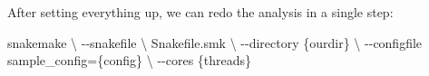 \documentclass[
  letterpaper,
  DIV=11,
  numbers=noendperiod]{scrreprt}
\newenvironment{Shaded}{\begin{snugshade}}{\end{snugshade}}
\newcommand{\DataTypeTok}[1]{\textcolor[rgb]{0.68,0.00,0.00}{#1}}
\newcommand{\ExtensionTok}[1]{\textcolor[rgb]{0.00,0.23,0.31}{#1}}
\newcommand{\NormalTok}[1]{\textcolor[rgb]{0.00,0.23,0.31}{#1}}
\begin{document}
After setting everything up, we can redo the analysis in a single step:

\begin{Shaded}
\begin{Highlighting}[]
\ExtensionTok{snakemake} \DataTypeTok{\textbackslash{}}
\NormalTok{{-}{-}snakefile }\DataTypeTok{\textbackslash{}}
\NormalTok{Snakefile.smk }\DataTypeTok{\textbackslash{}}
\NormalTok{{-}{-}directory \{ourdir\} }\DataTypeTok{\textbackslash{}}
\NormalTok{{-}{-}configfile sample\_config=\{config\} }\DataTypeTok{\textbackslash{}}
\NormalTok{{-}{-}cores \{threads\}}
\end{Highlighting}
\end{Shaded}
\end{document}

